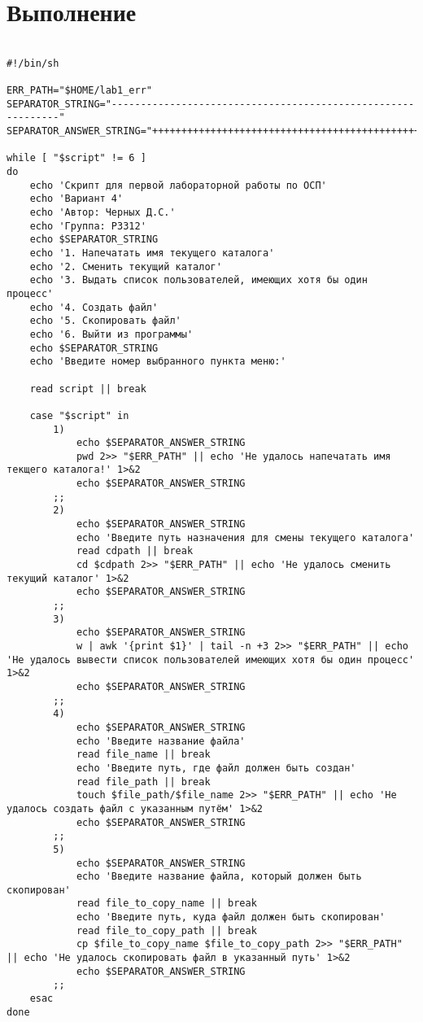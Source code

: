\section{Выполнение}
\begin{verbatim}

#!/bin/sh

ERR_PATH="$HOME/lab1_err"
SEPARATOR_STRING="-------------------------------------------------------------"
SEPARATOR_ANSWER_STRING="+++++++++++++++++++++++++++++++++++++++++++++++++++++++++++++"

while [ "$script" != 6 ]
do
    echo 'Скрипт для первой лабораторной работы по ОСП'
    echo 'Вариант 4'
    echo 'Автор: Черных Д.С.'
    echo 'Группа: P3312'
    echo $SEPARATOR_STRING
    echo '1. Напечатать имя текущего каталога'
    echo '2. Сменить текущий каталог'
    echo '3. Выдать список пользователей, имеющих хотя бы один процесс'
    echo '4. Создать файл'
    echo '5. Скопировать файл'
    echo '6. Выйти из программы'
    echo $SEPARATOR_STRING
    echo 'Введите номер выбранного пункта меню:'
    
    read script || break

    case "$script" in
        1)
            echo $SEPARATOR_ANSWER_STRING
            pwd 2>> "$ERR_PATH" || echo 'Не удалось напечатать имя текщего каталога!' 1>&2
            echo $SEPARATOR_ANSWER_STRING
        ;;
        2)
            echo $SEPARATOR_ANSWER_STRING
            echo 'Введите путь назначения для смены текущего каталога'
            read cdpath || break
            cd $cdpath 2>> "$ERR_PATH" || echo 'Не удалось сменить текущий каталог' 1>&2
            echo $SEPARATOR_ANSWER_STRING
        ;;
        3)
            echo $SEPARATOR_ANSWER_STRING
            w | awk '{print $1}' | tail -n +3 2>> "$ERR_PATH" || echo 'Не удалось вывести список пользователей имеющих хотя бы один процесс' 1>&2
            echo $SEPARATOR_ANSWER_STRING
        ;;
        4)
            echo $SEPARATOR_ANSWER_STRING
            echo 'Введите название файла'
            read file_name || break
            echo 'Введите путь, где файл должен быть создан'
            read file_path || break
            touch $file_path/$file_name 2>> "$ERR_PATH" || echo 'Не удалось создать файл с указанным путём' 1>&2
            echo $SEPARATOR_ANSWER_STRING
        ;;
        5)
            echo $SEPARATOR_ANSWER_STRING
            echo 'Введите название файла, который должен быть скопирован'
            read file_to_copy_name || break
            echo 'Введите путь, куда файл должен быть скопирован'
            read file_to_copy_path || break
            cp $file_to_copy_name $file_to_copy_path 2>> "$ERR_PATH" || echo 'Не удалось скопировать файл в указанный путь' 1>&2
            echo $SEPARATOR_ANSWER_STRING
        ;;
    esac
done
\end{verbatim}
